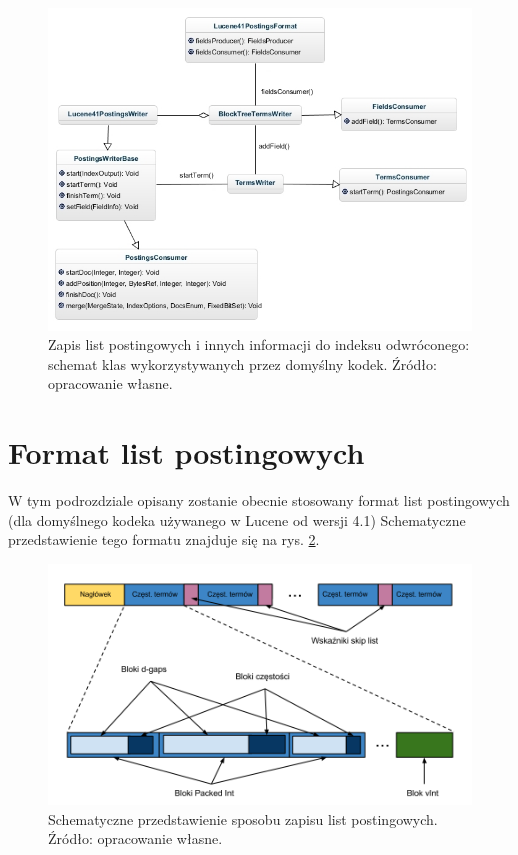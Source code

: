 \begin{figure}[here]
 \includegraphics[scale=0.64]{pictures/Lucene41PostingsFormatWrite.jpg}
 \caption{Zapis list postingowych i innych informacji do indeksu odwróconego: schemat klas wykorzystywanych przez domyślny kodek. Źródło: opracowanie własne. \label{fig:postingFormatWrite}}
\end{figure}

\section{Format list postingowych}

W tym podrozdziale opisany zostanie obecnie stosowany format list postingowych (dla domyślnego kodeka używanego w Lucene od wersji 4.1) Schematyczne przedstawienie tego formatu znajduje się na rys. \ref{fig:postingCodingFormat}.

\begin{figure}[here]
 \includegraphics[scale=0.37]{pictures/PostingCodingFormat.png}
 \caption{Schematyczne przedstawienie sposobu zapisu list postingowych. Źródło: opracowanie własne. \label{fig:postingCodingFormat}}
\end{figure}

